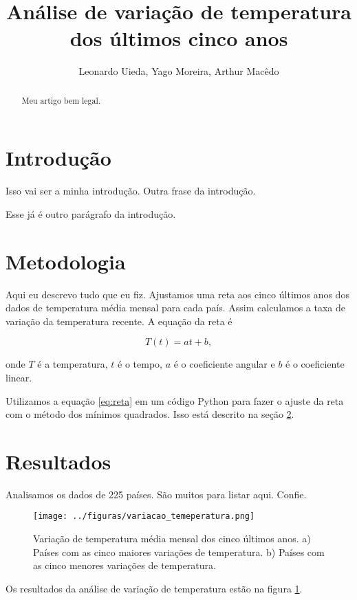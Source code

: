 \documentclass{article}
\begin{document}
\title{Análise de variação de temperatura dos últimos cinco anos}
\author{Leonardo Uieda, Yago Moreira, Arthur Macêdo}

\maketitle

\begin{abstract}
Meu artigo bem legal.
\end{abstract}

\section{Introdução}

Isso vai ser a minha introdução.
Outra frase da introdução.

Esse já é outro parágrafo da introdução.

\section{Metodologia}
\label{sec:metodos}

Aqui eu descrevo tudo que eu fiz.
Ajustamos uma reta aos cinco últimos anos dos dados de temperatura média mensal para cada país.
Assim calculamos a taxa de variação da temperatura recente.
A equação da reta é

\begin{equation}
T(t) = a t + b,
\label{eq:reta}
\end{equation}

\noindent
onde $T$ é a temperatura, $t$ é o tempo, $a$ é o coeficiente angular e $b$ é o coeficiente linear.

Utilizamos a equação \ref{eq:reta} em um código Python para fazer o ajuste da reta com o método dos mínimos quadrados.
Isso está descrito na seção \ref{sec:metodos}.

\section{Resultados}

Analisamos os dados de 225 países. São muitos para listar aqui. Confie.

\begin{figure}[!h]
	\texttt{[image: ../figuras/variacao\_temeperatura.png]}
	\caption{
		Variação de temperatura média mensal dos cinco últimos anos.
		a) Países com as cinco maiores variações de temperatura.
		b) Países com as cinco menores variações de temperatura.
	}
	\label{fig:variacao}
\end{figure}

Os resultados da análise de variação de temperatura estão na figura \ref{fig:variacao}.
\end{document}
